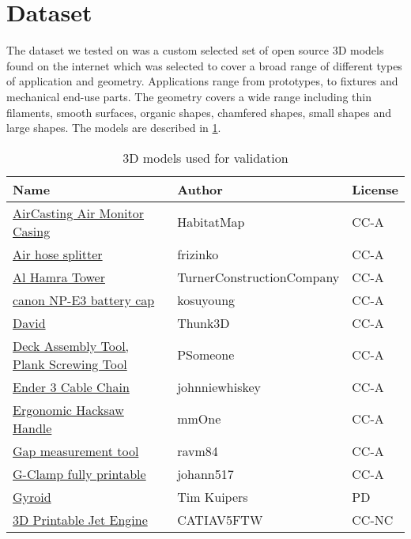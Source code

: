 \section{Dataset}\label{dataset}
The dataset we tested on was a custom selected set of open source 3D models found on the internet which was selected to cover a broad range of different types of application and geometry.
Applications range from prototypes, to fixtures and mechanical end-use parts.
The geometry covers a wide range including thin filaments, smooth surfaces, organic shapes, chamfered shapes, small shapes and large shapes.
The models are described in \cref{dataset_description}.

\begin{table}
\caption{3D models used for validation}\label{dataset_description}
\begin{tabular}{l l l}
Name & Author & License \\
\hline
\href{	https://www.thingiverse.com/thing:26555	}{	AirCasting Air Monitor Casing	} & 	HabitatMap	 & 	CC-A	\\
\href{	https://www.thingiverse.com/thing:3629434	}{	Air hose splitter	} & 	frizinko	 & 	CC-A	\\
\href{	https://www.thingiverse.com/thing:1155772	}{	Al Hamra Tower	} & 	TurnerConstructionCompany	 & 	CC-A	\\
\href{	https://www.thingiverse.com/thing:1498967	}{	canon NP-E3 battery cap	} & 	kosuyoung	 & 	CC-A	\\
\href{	https://www.thingiverse.com/thing:3567409	}{	David	} & 	Thunk3D	 & 	CC-A	\\
\href{	https://www.thingiverse.com/thing:3132621	}{	Deck Assembly Tool, Plank Screwing Tool	} & 	PSomeone	 & 	CC-A	\\
\href{	https://www.thingiverse.com/thing:2920060	}{	Ender 3 Cable Chain	} & 	johnniewhiskey	 & 	CC-A	\\
\href{	https://www.thingiverse.com/thing:2993875	}{	Ergonomic Hacksaw Handle	} & 	mmOne	 & 	CC-A	\\
\href{	https://www.thingiverse.com/thing:2513922	}{	Gap measurement tool	} & 	ravm84	 & 	CC-A	\\
\href{	https://www.thingiverse.com/thing:1673030	}{	G-Clamp fully printable	} & 	johann517	 & 	CC-A	\\
\href{	https://www.youmagine.com/designs/gyroid	}{	Gyroid	} & 	Tim Kuipers	 & 	PD	\\
\href{	https://www.thingiverse.com/thing:1327093	}{	3D Printable Jet Engine	} & 	CATIAV5FTW	 & 	CC-NC	\\

\end{tabular}
\end{table}
